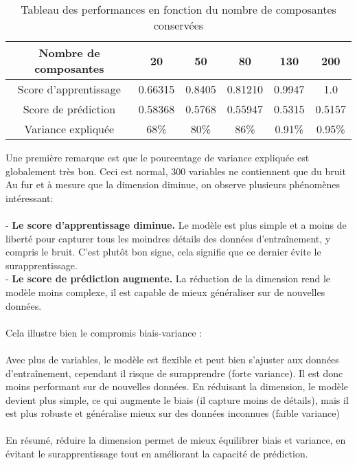 \documentclass{article}
\begin{document}
\begin{table}[h]
    \centering
    \begin{tabular}{|c|c|c|c|c|c|}
    \hline    Nombre de composantes & 20 & 50 & 80 & 130 & 200\\
    \hline   Score d'apprentissage  & 0.66315 & 0.8405 & 0.81210 & 0.9947 & 1.0\\
    \hline   Score de prédiction  & 0.58368 & 0.5768 & 0.55947 & 0.5315 & 0.5157 \\
    \hline    Variance expliquée &68\%  & 80\% & 86\% & 0.91\% & 0.95\%\\
    \hline
    \end{tabular}
    \caption{Tableau des performances en fonction du nombre de composantes conservées}
    \label{tab:my_label}
\end{table}
Une première remarque est que le pourcentage de variance expliquée est globalement très bon. Ceci est normal,  300 variables ne contiennent que du bruit
Au fur et à mesure que la dimension diminue, on observe plusieurs phénomènes intéressant:
\\
\\
- \textbf{Le score d'apprentissage diminue.} Le modèle est plus simple et a moins de liberté pour capturer tous les moindres détails des données d'entraînement, y compris le bruit. C'est plutôt bon signe, cela signifie que ce dernier évite le surapprentissage.
\\
- \textbf{Le score de prédiction augmente.} La réduction de la dimension rend le modèle moins complexe, il est capable de mieux généraliser sur de nouvelles données.  
\\
\\
Cela illustre bien le compromis biais-variance :
\\
\\
Avec plus de variables, le modèle est flexible et peut bien s'ajuster aux données d'entraînement, cependant il risque de surapprendre (forte variance). Il est donc moins performant sur de nouvelles données.
En réduisant la dimension, le modèle devient plus simple, ce qui augmente le biais (il capture moins de détails), mais il est plus robuste et généralise mieux sur des données inconnues (faible variance)
\\
\\ En résumé, réduire la dimension permet de mieux équilibrer biais et variance, en évitant le surapprentissage tout en améliorant la capacité de prédiction.
\end{document}
